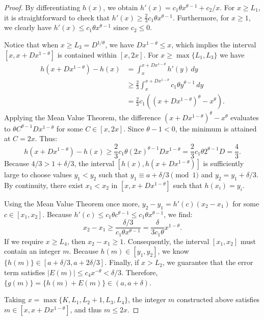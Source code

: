 \documentclass[10pt,a4paper]{amsart}
\begin{document}
\begin{proof}
By differentiating $h(x)$, we obtain $h'(x) = c_{1}\theta x^{\theta-1} + c_{2}/x$. For $x \geq L_{1}$, it is straightforward to check that $h'(x) \geq \frac{2}{3}c_{1}\theta x^{\theta-1}$. Furthermore, for $x \geq 1$, we clearly have $h'(x) \leq c_{1}\theta x^{\theta-1}$ since $c_2 \leq 0$. 

Notice that when $x \geq L_{3} = D^{1/\theta}$, we have $Dx^{1-\theta} \leq x$, which implies the interval $[x, x+Dx^{1-\theta}]$ is contained within $[x, 2x]$. For $x \geq \max\{L_1, L_3\}$ we have
\begin{align*}
h(x+Dx^{1-\theta}) - h(x) &= \int_{x}^{x+Dx^{1-\theta}} h'(y) \, dy \\
&\geq \frac{2}{3} \int_x^{x+Dx^{1-\theta}} c_1 \theta y^{\theta-1} \, dy \\
&= \frac{2}{3} c_1 \left( (x+Dx^{1-\theta})^\theta - x^\theta \right).
\end{align*}
Applying the Mean Value Theorem, the difference $(x+Dx^{1-\theta})^\theta - x^\theta$ evaluates to $\theta C^{\theta-1} Dx^{1-\theta}$ for some $C \in [x, 2x]$. Since $\theta - 1 < 0$, the minimum is attained at $C = 2x$. Thus:
\begin{equation*}
h(x+Dx^{1-\theta}) - h(x) \geq \frac{2}{3} c_1 \theta (2x)^{\theta-1} D x^{1-\theta} = \frac{2}{3} c_1 \theta 2^{\theta-1} D = \frac{4}{3}.
\end{equation*}
Because $4/3 > 1 + \delta/3$, the interval $[h(x), h(x+Dx^{1-\theta})]$ is sufficiently large to choose values $y_{1} < y_{2}$ such that $y_1 \equiv a + \delta/3 \pmod 1$ and $y_{2} = y_{1} + \delta/3$. By continuity, there exist $x_1 < x_2$ in $[x, x+Dx^{1-\theta}]$ such that $h(x_i) = y_i$. 

Using the Mean Value Theorem once more, $y_2 - y_1 = h'(c)(x_2 - x_1)$ for some $c \in [x_1, x_2]$. Because $h'(c) \leq c_1 \theta c^{\theta-1} \leq c_1 \theta x^{\theta-1}$, we find:
\begin{equation*}
x_{2}-x_{1} \geq \frac{\delta/3}{c_1 \theta x^{\theta-1}} = \frac{\delta}{3 c_{1}\theta}x^{1-\theta}.
\end{equation*}
If we require $x \geq L_{4}$, then $x_{2}-x_{1} \geq 1$. Consequently, the interval $[x_{1},x_{2}]$ must contain an integer $m$. Because $h(m) \in [y_1, y_2]$, we know $\{h(m)\} \in [a+\delta/3, a+2\delta/3]$. Finally, if $x > L_2$, we guarantee that the error term satisfies $|E(m)| \leq c_4 x^{-\theta} < \delta/3$. Therefore, $\{g(m)\} = \{h(m) + E(m)\} \in (a, a+\delta)$.

Taking $x = \max\{K, L_1, L_2+1, L_3, L_4\}$, the integer $m$ constructed above satisfies $m \in [x,x+Dx^{1-\theta}]$, and thus $m \leq 2x$.
\end{proof}
\end{document}
